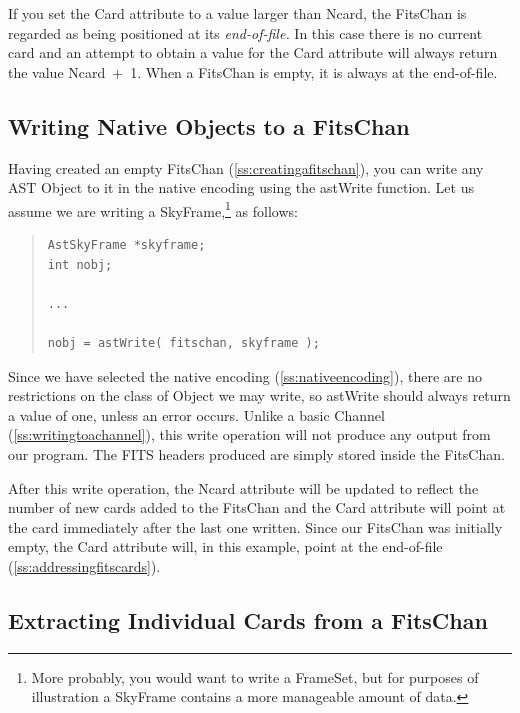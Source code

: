 \documentclass[twoside,11pt]{article}
\newcommand{\htmlref}[2]{#1}
\newcommand{\secref}[1]{\S\ref{#1}}
\renewcommand{\secref}[1]{\ref{#1}}
\begin{document}
If you set the Card attribute to a value larger than Ncard, the
FitsChan is regarded as being positioned at its {\em{end-of-file.}} In
this case there is no current card and an attempt to obtain a value
for the Card attribute will always return the value Ncard~$+$~1. When
a FitsChan is empty, it is always at the end-of-file.
 
\subsection{\label{ss:writingnativefits}Writing Native Objects to a FitsChan}

Having created an empty \htmlref{FitsChan}{FitsChan} (\secref{ss:creatingafitschan}), you
can write any AST \htmlref{Object}{Object} to it in the native encoding using the
\htmlref{astWrite}{astWrite} function. Let us assume we are writing a
\htmlref{SkyFrame}{SkyFrame},\footnote{More probably, you would want to write a \htmlref{FrameSet}{FrameSet},
but for purposes of illustration a SkyFrame contains a more manageable
amount of data.} as follows:

\begin{quote}
\small
\begin{verbatim}
AstSkyFrame *skyframe;
int nobj;

...

nobj = astWrite( fitschan, skyframe );
\end{verbatim}
\normalsize
\end{quote}

Since we have selected the native encoding
(\secref{ss:nativeencoding}), there are no restrictions on the class
of Object we may write, so astWrite should always return a value of
one, unless an error occurs. Unlike a basic \htmlref{Channel}{Channel}
(\secref{ss:writingtoachannel}), this write operation will not produce
any output from our program. The FITS headers produced are simply
stored inside the FitsChan.

After this write operation, the \htmlref{Ncard}{Ncard} attribute will be updated to
reflect the number of new cards added to the FitsChan and the \htmlref{Card}{Card}
attribute will point at the card immediately after the last one
written. Since our FitsChan was initially empty, the Card attribute
will, in this example, point at the end-of-file
(\secref{ss:addressingfitscards}).

\subsection{\label{ss:extractingfitscards}Extracting Individual Cards from a FitsChan}
\end{document}
